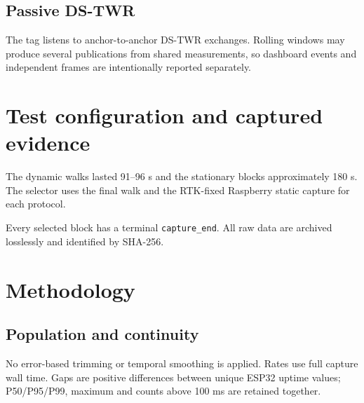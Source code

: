 \documentclass[10pt,a4paper]{article}
\begin{document}
\subsection{Passive DS-TWR}
The tag listens to anchor-to-anchor DS-TWR exchanges. Rolling windows may
produce several publications from shared measurements, so dashboard events and
independent frames are intentionally reported separately.

\section{Test configuration and captured evidence}
The dynamic walks lasted 91--96 s and the stationary blocks approximately 180 s.
The selector uses the final walk and the RTK-fixed Raspberry static capture for
each protocol.
\begin{center}\scriptsize{}\end{center}
Every selected block has a terminal \texttt{capture\_end}. All raw data are
archived losslessly and identified by SHA-256.

\section{Methodology}
\subsection{Population and continuity}
No error-based trimming or temporal smoothing is applied. Rates use full
capture wall time. Gaps are positive differences between unique ESP32 uptime
values; P50/P95/P99, maximum and counts above 100 ms are retained together.
\end{document}
